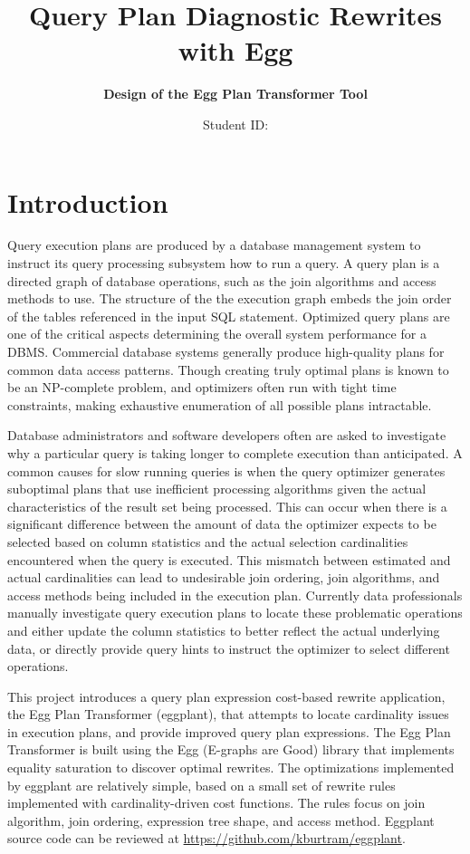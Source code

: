\documentclass{article}
\title{\textbf{Query Plan Diagnostic Rewrites with Egg}}
\subtitle{\textbf{Design of the Egg Plan Transformer Tool}}
\author{\studentname \qquad Student ID: \uwid}
\begin{document}
\maketitle

\section*{Introduction}
Query execution plans are produced by a database management system to instruct its
query processing subsystem how to run a query.  A query plan is a directed graph of database
operations, such as the join algorithms and access methods to use.  The structure of the 
the execution graph embeds the join order of the tables referenced in the input SQL
statement.  Optimized query plans are one of the critical aspects determining the overall 
system performance for a DBMS.  Commercial database systems generally produce high-quality 
plans for common data access patterns. Though creating truly optimal plans is known to be 
an NP-complete problem, and optimizers often run with tight time constraints, making exhaustive 
enumeration of all possible plans intractable.

Database administrators and software developers often are asked to investigate why a particular query is
taking longer to complete execution than anticipated.  A common causes for slow running queries
is when the query optimizer generates suboptimal plans that use inefficient processing algorithms given
the actual characteristics of the result set being processed.  This can occur when there is a 
significant difference between the amount of data the optimizer expects to be selected based on column statistics
and the actual selection cardinalities encountered when the query is executed.  This mismatch between
estimated and actual cardinalities can lead to undesirable join ordering, join algorithms, and 
access methods being included in the execution plan.  Currently data professionals manually investigate
query execution plans to locate these problematic operations and either update the column statistics to
better reflect the actual underlying data, or directly provide query hints to instruct the optimizer
to select different operations.

This project introduces a query plan expression cost-based rewrite application, the Egg Plan Transformer (eggplant),
that attempts to locate cardinality issues in execution plans, and provide improved query plan expressions.
The Egg Plan Transformer is built using the Egg (E-graphs are Good) library that
implements equality saturation to discover optimal rewrites. \cite{Willsey:2020} The optimizations implemented 
by eggplant are relatively simple, based on a small set of rewrite rules implemented with cardinality-driven 
cost functions.  The rules  focus on join algorithm, join ordering, expression tree shape, and access method.  
Eggplant source code can be reviewed at
\href{https://github.com/kburtram/eggplant}{https://github.com/kburtram/eggplant}.
\end{document}
